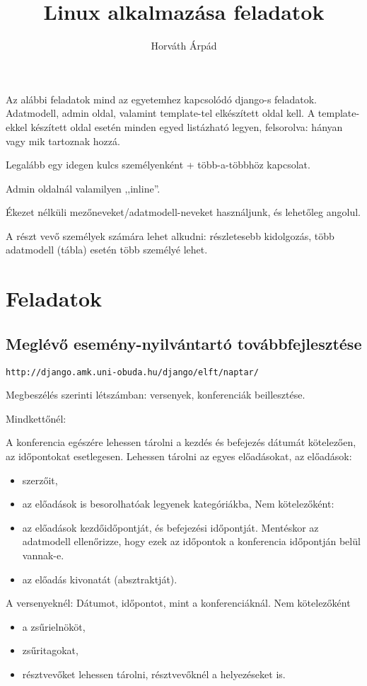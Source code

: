 \documentclass[a4paper]{article}
\begin{document}
\title{Linux alkalmazása feladatok}
\author{Horváth Árpád}
\maketitle

Az alábbi feladatok mind az egyetemhez kapcsolódó django-s feladatok.
Adatmodell, admin oldal, valamint template-tel elkészített oldal kell.
A template-ekkel készített oldal esetén minden egyed listázható legyen,
felsorolva: hányan vagy mik tartoznak hozzá.

Legalább egy idegen kulcs személyenként + több-a-többhöz kapcsolat.

Admin oldalnál valamilyen ,,inline''.

Ékezet nélküli mezőneveket/adatmodell-neveket használjunk, és lehetőleg angolul.

A részt vevő személyek számára lehet alkudni: részletesebb kidolgozás,
több adatmodell (tábla) esetén több személyé lehet.

\section{Feladatok}

\subsection{Meglévő esemény-nyilvántartó továbbfejlesztése}

\verb!http://django.amk.uni-obuda.hu/django/elft/naptar/!

Megbeszélés szerinti létszámban: versenyek, konferenciák beillesztése.

Mindkettőnél:

A konferencia egészére lehessen tárolni a kezdés és befejezés dátumát
kötelezően, az időpontokat esetlegesen.
Lehessen tárolni az egyes előadásokat,
az előadások:
\begin{itemize}
    \item szerzőit,
    \item az előadások is besorolhatóak legyenek kategóriákba,
	Nem kötelezőként:
    \item az előadások kezdőidőpontját, és befejezési
	időpontját. Mentéskor az adatmodell ellenőrizze, hogy ezek az időpontok
	a konferencia időpontján belül vannak-e.
    \item az előadás kivonatát (absztraktját).
\end{itemize}

A versenyeknél:
Dátumot, időpontot, mint a konferenciáknál.
Nem kötelezőként
\begin{itemize}
    \item a zsűrielnököt,
    \item zsűritagokat,
    \item résztvevőket lehessen tárolni, résztvevőknél a helyezéseket is.
\end{itemize}
\end{document}
